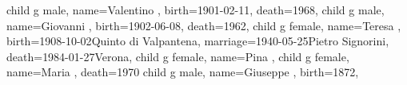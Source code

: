 \documentclass{article}
\begin{document}
\begin{midpage}
\begin{center}
\begin{genealogypicture}
{{{            child{
                g{
                    male,
                    name={Valentino },
                    birth={1901-02-11}{},
                    death={1968}{},
                }
            }
            child{
                g{
                    male,
                    name={Giovanni },
                    birth={1902-06-08}{},
                    death={1962}{},
                }
            }
            child{
                g{
                    female,
                    name={Teresa },
                    birth={1908-10-02}{Quinto di Valpantena},
                    marriage={1940-05-25}{Pietro Signorini},
                    death={1984-01-27}{Verona},
                }
            }
            child{
                g{
                    female,
                    name={Pina },
                }
            }
            child{
                g{
                    female,
                    name={Maria },
                    death={1970}{}
                }
            }
        }
        child{
            g{
                male,
                name={Giuseppe },
                birth={1872}{},
            }
        }
    }
}
\end{genealogypicture}

\end{center}
\end{midpage}
\end{document}
